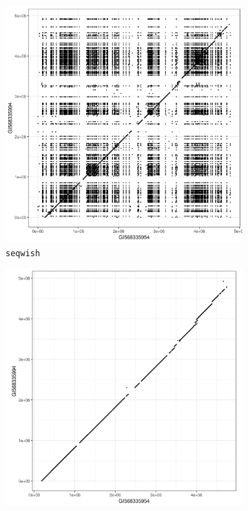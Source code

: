 \begin{figure}[htbp!]
  \begin{subfigure}[t]{0.49\textwidth}
    \includegraphics[width=1.0\textwidth]{Chapter3/Figs/seqwish_GI568335954_GI568335994_dotplot.png}
    \caption{{\tt seqwish}}
    \label{subfig:seqwish_mhc_dotplot}
  \end{subfigure}
  \begin{subfigure}[t]{0.49\textwidth}
    \includegraphics[width=1.0\textwidth]{Chapter3/Figs/vg_msga_GI568335954_GI568335994_dotplot.png}

\end{subfigure}
\end{figure}
